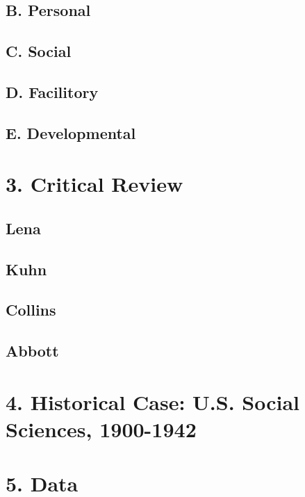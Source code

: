 \documentclass[]{article}
\begin{document}
\subsection{B. Personal}\label{b.-personal}

\subsection{C. Social}\label{c.-social}

\subsection{D. Facilitory}\label{d.-facilitory}

\subsection{E. Developmental}\label{e.-developmental}

\section{3. Critical Review}\label{critical-review}

\subsection{Lena}\label{lena}

\subsection{Kuhn}\label{kuhn}

\subsection{Collins}\label{collins}

\subsection{Abbott}\label{abbott}

\section{4. Historical Case: U.S. Social Sciences,
1900-1942}\label{historical-case-u.s.-social-sciences-1900-1942}

\section{5. Data}\label{data}
\end{document}
